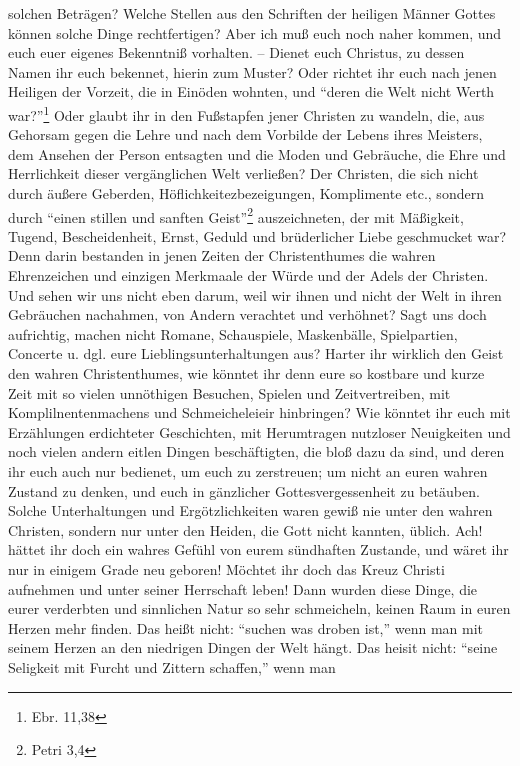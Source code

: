 solchen Beträgen? Welche Stellen aus den Schriften der heiligen Männer Gottes
können solche Dinge rechtfertigen? Aber ich muß euch noch naher kommen, und euch
euer eigenes Bekenntniß vorhalten. -- Dienet euch Christus, zu dessen Namen ihr
euch bekennet, hierin zum Muster? Oder richtet ihr euch nach jenen Heiligen der
Vorzeit, die in Einöden wohnten, und "`deren die Welt nicht Werth
war?"'\footnote{Ebr. 11,38} Oder glaubt ihr in den Fußstapfen jener Christen zu
wandeln, die, aus Gehorsam gegen die Lehre und nach dem Vorbilde der Lebens
ihres Meisters, dem Ansehen der Person entsagten und die Moden und Gebräuche,
die Ehre und Herrlichkeit dieser vergänglichen Welt verließen? Der Christen, die
sich nicht durch äußere Geberden, Höflichkeitezbezeigungen, Komplimente etc.,
sondern durch "`einen stillen und sanften Geist"'\footnote{Petri 3,4}
auszeichneten, der mit Mäßigkeit, Tugend, Bescheidenheit, Ernst, Geduld und
brüderlicher Liebe geschmucket war? Denn darin bestanden in jenen Zeiten der
Christenthumes die wahren Ehrenzeichen und einzigen Merkmaale der Würde und der
Adels der Christen. Und sehen wir uns nicht eben darum, weil wir ihnen und nicht
der Welt in ihren Gebräuchen nachahmen, von Andern verachtet und verhöhnet? Sagt
uns doch aufrichtig, machen nicht Romane, Schauspiele, Maskenbälle,
Spielpartien, Concerte u. dgl. eure Lieblingsunterhaltungen aus? Harter ihr
wirklich den Geist den wahren Christenthumes, wie könntet ihr denn eure so
kostbare und kurze Zeit mit so vielen unnöthigen Besuchen, Spielen und
Zeitvertreiben, mit Komplilnentenmachens und Schmeicheleieir hinbringen? Wie
könntet ihr euch mit Erzählungen erdichteter Geschichten, mit Herumtragen
nutzloser Neuigkeiten und noch vielen andern eitlen Dingen beschäftigten, die
bloß dazu da sind, und deren ihr euch auch nur bedienet, um euch zu zerstreuen;
um nicht an euren wahren Zustand zu denken, und euch in gänzlicher
Gottesvergessenheit zu betäuben. Solche Unterhaltungen und Ergötzlichkeiten
waren gewiß nie unter den wahren Christen, sondern nur unter den Heiden, die
Gott nicht kannten, üblich. Ach! hättet ihr doch ein wahres Gefühl von eurem
sündhaften Zustande, und wäret ihr nur in einigem Grade neu geboren! Möchtet ihr
doch das Kreuz Christi aufnehmen und unter seiner Herrschaft leben! Dann wurden
diese Dinge, die eurer verderbten und sinnlichen Natur so sehr schmeicheln,
keinen Raum in euren Herzen mehr finden. Das heißt nicht: "`suchen was droben
ist,"'  wenn man mit seinem Herzen an den niedrigen Dingen der Welt hängt. Das
heisit nicht: "`seine Seligkeit mit Furcht und Zittern schaffen,"' wenn man

